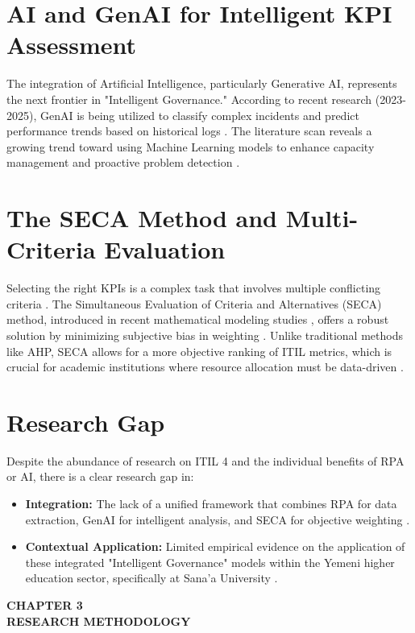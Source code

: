 \documentclass[12pt,a4paper,oneside]{report}
\begin{document}
\section{AI and GenAI for Intelligent KPI Assessment}
The integration of Artificial Intelligence, particularly Generative AI, represents the next frontier in "Intelligent Governance." \cite{almontaser2025} According to recent research (2023-2025), GenAI is being utilized to classify complex incidents and predict performance trends based on historical logs \cite{almontaser2025}. The literature scan reveals a growing trend toward using Machine Learning models to enhance capacity management and proactive problem detection \cite{genai_agility_2025, rpa_business_2023}.

\section{The SECA Method and Multi-Criteria Evaluation}
Selecting the right KPIs is a complex task that involves multiple conflicting criteria \cite{almontaser2025}. The Simultaneous Evaluation of Criteria and Alternatives (SECA) method, introduced in recent mathematical modeling studies \cite{seca_method_2021}, offers a robust solution by minimizing subjective bias in weighting \cite{seca_method_2021}. Unlike traditional methods like AHP, SECA allows for a more objective ranking of ITIL metrics, which is crucial for academic institutions where resource allocation must be data-driven \cite{almontaser2025}.

\section{Research Gap} 
Despite the abundance of research on ITIL 4 and the individual benefits of RPA or AI, there is a clear research gap in: \cite{almontaser2025}
\begin{itemize}
    \item \textbf{Integration:} The lack of a unified framework that combines RPA for data extraction, GenAI for intelligent analysis, and SECA for objective weighting \cite{almontaser2025}.
    \item \textbf{Contextual Application:} Limited empirical evidence on the application of these integrated "Intelligent Governance" models within the Yemeni higher education sector, specifically at Sana’a University \cite{almontaser2025}.
\end{itemize}

\clearpage
\thispagestyle{empty} 
\vspace*{\fill}
\begin{center}
    {\Huge\bfseries CHAPTER 3} \\[0.5cm]
    {\Huge\bfseries RESEARCH METHODOLOGY}
\end{center}
\vspace*{\fill}
\clearpage
\end{document}
